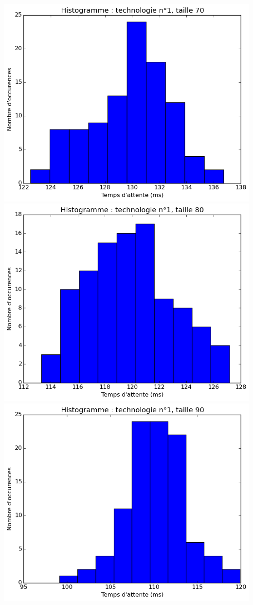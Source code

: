 \documentclass[a4paper,10pt]{article}
\begin{document}
\\
\includegraphics[scale=0.4]{img/1-70.png}
\includegraphics[scale=0.4]{img/1-80.png}
\\
\includegraphics[scale=0.4]{img/1-90.png}
\end{document}

